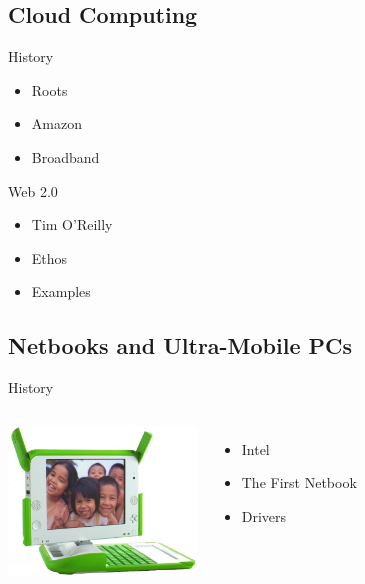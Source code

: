\documentclass{beamer}
\begin{document}

\subsection{Cloud Computing}

\begin{frame}{History}
  \begin{itemize}
  \item Roots
  \item Amazon
  \item Broadband
  \end{itemize}
\end{frame}

\begin{frame}{Web 2.0}
  \begin{itemize}
  \item Tim O'Reilly
  \item Ethos
  \item Examples
  \end{itemize}
\end{frame}

\subsection{Netbooks and Ultra-Mobile PCs}

\begin{frame}{History}
  \begin{columns}
    \column{5cm}
      \includegraphics[width=5cm]{olpc.jpg}
    \column{5cm}
      \begin{itemize}
      \item Intel %
      \item The First Netbook
      \item Drivers
      \end{itemize}
  \end{columns}
\end{frame}
\end{document}

